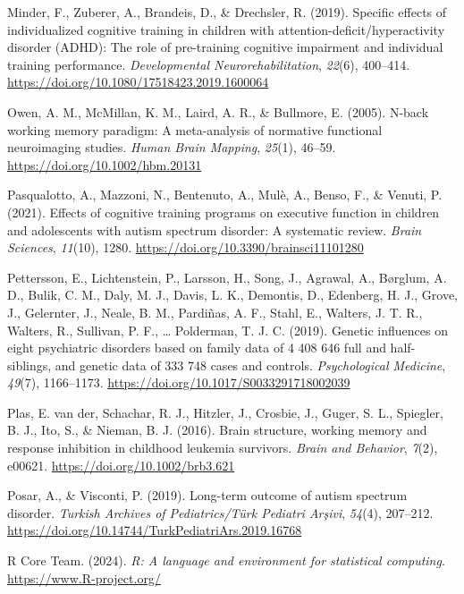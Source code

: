\documentclass[
  letterpaper,
]{ut-thesis}
\newlength{\cslhangindent}
\newenvironment{CSLReferences}[2] %
 {\begin{list}{}{%
  \setlength{\itemindent}{0pt}
  \setlength{\leftmargin}{0pt}
  \setlength{\parsep}{0pt}
  \ifodd #1
   \setlength{\leftmargin}{\cslhangindent}
   \setlength{\itemindent}{-1\cslhangindent}
  \fi
  \setlength{\itemsep}{#2\baselineskip}}}
 {\end{list}}
\begin{document}
\begin{CSLReferences}{1}{0}
Minder, F., Zuberer, A., Brandeis, D., \& Drechsler, R. (2019). Specific
effects of individualized cognitive training in children with
attention-deficit/hyperactivity disorder ({ADHD}): {The} role of
pre-training cognitive impairment and individual training performance.
\emph{Developmental Neurorehabilitation}, \emph{22}(6), 400--414.
\url{https://doi.org/10.1080/17518423.2019.1600064}

Owen, A. M., McMillan, K. M., Laird, A. R., \& Bullmore, E. (2005).
N-back working memory paradigm: A meta-analysis of normative functional
neuroimaging studies. \emph{Human Brain Mapping}, \emph{25}(1), 46--59.
\url{https://doi.org/10.1002/hbm.20131}

Pasqualotto, A., Mazzoni, N., Bentenuto, A., Mulè, A., Benso, F., \&
Venuti, P. (2021). Effects of cognitive training programs on executive
function in children and adolescents with autism spectrum disorder: A
systematic review. \emph{Brain Sciences}, \emph{11}(10), 1280.
\url{https://doi.org/10.3390/brainsci11101280}

Pettersson, E., Lichtenstein, P., Larsson, H., Song, J., Agrawal, A.,
Børglum, A. D., Bulik, C. M., Daly, M. J., Davis, L. K., Demontis, D.,
Edenberg, H. J., Grove, J., Gelernter, J., Neale, B. M., Pardiñas, A.
F., Stahl, E., Walters, J. T. R., Walters, R., Sullivan, P. F., \ldots{}
Polderman, T. J. C. (2019). Genetic influences on eight psychiatric
disorders based on family data of 4 408 646 full and half-siblings, and
genetic data of 333 748 cases and controls. \emph{Psychological
Medicine}, \emph{49}(7), 1166--1173.
\url{https://doi.org/10.1017/S0033291718002039}

Plas, E. van der, Schachar, R. J., Hitzler, J., Crosbie, J., Guger, S.
L., Spiegler, B. J., Ito, S., \& Nieman, B. J. (2016). Brain structure,
working memory and response inhibition in childhood leukemia survivors.
\emph{Brain and Behavior}, \emph{7}(2), e00621.
\url{https://doi.org/10.1002/brb3.621}

Posar, A., \& Visconti, P. (2019). Long-term outcome of autism spectrum
disorder. \emph{Turkish Archives of Pediatrics/Türk Pediatri Arşivi},
\emph{54}(4), 207--212.
\url{https://doi.org/10.14744/TurkPediatriArs.2019.16768}

R Core Team. (2024). \emph{R: A language and environment for statistical
computing}. \url{https://www.R-project.org/}


\end{CSLReferences}
\end{document}
